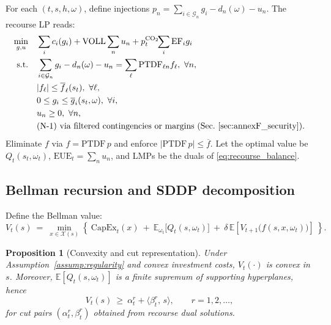 \documentclass[11pt]{article}
\newcommand{\E}{\mathbb{E}}
\numberwithin{equation}{section}
\newtheorem{proposition}{Proposition}[section]
\theoremstyle{definition}
\theoremstyle{remark}
\begin{document}
For each $(t,s,h,\omega)$, define injections $p_{n}=\sum_{i\in \mathcal G_n}g_i - d_{n}(\omega) - u_{n}$.
The recourse LP reads:
\begin{align}
\min_{g,u} \quad &
\sum_{i} c_i(g_i) + \mathrm{VOLL}\sum_{n} u_{n}+ p^{\mathrm{CO}_2}_{t}\!\!\sum_{i}\mathrm{EF}_i g_i \label{eq:recourse_obj}\\
\text{s.t.}\quad
& \sum_{i\in\mathcal G_n} g_i - d_{n}(\omega) - u_{n}
= \sum_{\ell}\mathrm{PTDF}_{\ell n} f_\ell,\ \forall n, \label{eq:recourse_balance}\\
& |f_\ell| \le \overline f_{\ell}(s_t),\ \forall \ell, \label{eq:recourse_flowl}\\
& 0\le g_{i} \le \overline g_{i}(s_t,\omega),\ \forall i, \label{eq:recourse_gencap}\\
& u_{n}\ge 0,\ \forall n, \label{eq:recourse_shed}\\
& \text{(N-1) via filtered contingencies or margins (Sec.~\ref{sec:annexF_security}).} \nonumber
\end{align}
Eliminate $f$ via $f=\mathrm{PTDF}\,p$ and enforce $|\mathrm{PTDF}\,p|\le \overline f$.
Let the optimal value be $Q_t(s_t,\omega_t)$, $\mathrm{EUE}_t=\sum_n u_n$, and LMPs be the duals of \eqref{eq:recourse_balance}.

\subsection{Bellman recursion and SDDP decomposition}

Define the Bellman value:
\begin{equation}\label{eq:bellman}
V_t(s) \ =\ \min_{x\in \mathcal X(s)}\left\{\ \mathrm{CapEx}_t(x)\ +\ \E_{\omega_t}\big[Q_t(s,\omega_t)\big]\ +\ \delta\,\E\!\left[V_{t+1}\!\big(f(s,x,\omega_t)\big)\right]\ \right\}.
\end{equation}

\begin{proposition}[Convexity and cut representation]\label{prop:convexity_cuts}
Under Assumption~\ref{assump:regularity} and convex investment costs, $V_t(\cdot)$ is convex in $s$. Moreover, $\E[Q_t(s,\omega_t)]$ is a finite supremum of supporting hyperplanes, hence
\begin{equation}
V_t(s) \ \ge\ \alpha_t^r + \langle \beta_t^r,\, s\rangle,\qquad r=1,2,\dots,
\end{equation}
for cut pairs $(\alpha_t^r,\beta_t^r)$ obtained from recourse dual solutions.
\end{proposition}
\end{document}
